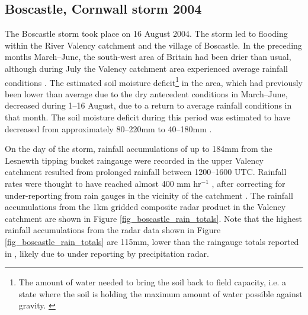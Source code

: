 \subsection{Boscastle, Cornwall storm 2004}
The Boscastle storm took place on 16 August 2004. The storm led to flooding within the River Valency catchment and the village of Boscastle. In the preceding months March--June, the south-west area of Britain had been drier than usual, although during July the Valency catchment area experienced average rainfall conditions \citep{golding2005boscastle}. The estimated soil moisture deficit\footnote{The amount of water needed to bring the soil back to field capacity, i.e. a state where the soil is holding the maximum amount of water possible against gravity. \citep{beven2011rainfall}} in the area, which had previously been lower than average due to the dry antecedent conditions in March--June, decreased during 1--16 August, due to a return to average rainfall conditions in that month. The soil moisture deficit during this period was estimated to have decreased from approximately 80--220mm to 40--180mm \citep{golding2005boscastle}.

On the day of the storm, rainfall accumulations of up to 184mm from the Lesnewth tipping bucket raingauge \citep{golding2005boscastle} were recorded in the upper Valency catchment resulted from prolonged rainfall between 1200--1600 UTC. Rainfall rates were thought to have reached almost 400 mm hr\(^{-1}\) \citep{golding2005boscastle}, after correcting for under-reporting from rain gauges in the vicinity of the catchment \citep{burt2005cloudburst}. The rainfall accumulations from the 1km gridded composite radar product in the Valency catchment are shown in Figure \ref{fig_boscastle_rain_totals}. Note that the highest rainfall accumulations from the radar data shown in Figure \ref{fig_boscastle_rain_totals} are 115mm, lower than the raingauge totals reported in \citet{golding2005boscastle}, likely due to under reporting by precipitation radar. 


